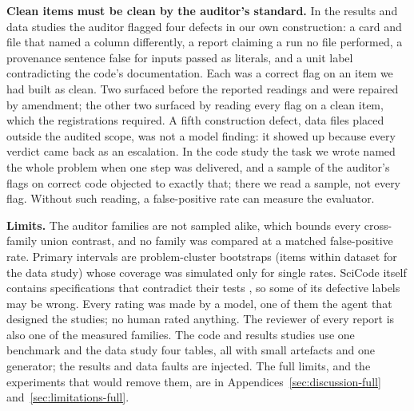 \textbf{Clean items must be clean by the auditor's standard.} In the results and data studies the
auditor flagged four defects in our own construction: a card and file that named a column
differently, a report claiming a run no file performed, a provenance sentence false for inputs passed
as literals, and a unit label contradicting the code's documentation. Each was a correct flag on an
item we had built as clean. Two surfaced before the reported readings and were repaired by amendment;
the other two surfaced by reading every flag on a clean item, which the registrations required. A
fifth construction defect, data files placed outside the audited scope, was not a model finding: it
showed up because every verdict came back as an escalation. In the code study the task we wrote named the whole problem when one step was delivered,
and a sample of the auditor's flags on correct code objected to exactly that; there we read a sample,
not every flag. Without such reading, a false-positive rate can measure the evaluator.

\textbf{Limits.} The auditor families are not sampled alike, which bounds every cross-family union
contrast, and no family was compared at a matched false-positive rate. Primary intervals are
problem-cluster bootstraps (items within dataset for the data study) whose coverage was simulated only
for single rates. SciCode itself contains specifications that contradict their tests
\citep{hu2026scicodeverified}, so some of its defective labels may be wrong. Every rating was made
by a model, one of them the agent that designed the studies; no human rated anything. The reviewer of
every report is also one of the measured families. The code and results studies use one benchmark and
the data study four tables, all with small artefacts and one generator; the results and data faults
are injected. The full limits, and the
experiments that would remove them, are in Appendices~\ref{sec:discussion-full} and~\ref{sec:limitations-full}.
